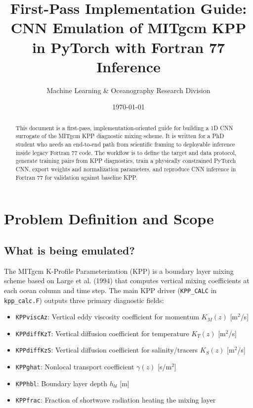 \documentclass[11pt, a4paper]{article}
\title{\textbf{First-Pass Implementation Guide: \\ CNN Emulation of MITgcm KPP in PyTorch with Fortran 77 Inference}}
\author{Machine Learning \& Oceanography Research Division}
\date{\today}
\begin{document}
\maketitle

\begin{abstract}
This document is a first-pass, implementation-oriented guide for building a 1D CNN surrogate of the MITgcm KPP diagnostic mixing scheme. It is written for a PhD student who needs an end-to-end path from scientific framing to deployable inference inside legacy Fortran 77 code. The workflow is to define the target and data protocol, generate training pairs from KPP diagnostics, train a physically constrained PyTorch CNN, export weights and normalization parameters, and reproduce CNN inference in Fortran 77 for validation against baseline KPP.
\end{abstract}

\tableofcontents
\newpage

\section{Problem Definition and Scope}

\subsection{What is being emulated?}

The MITgcm K-Profile Parameterization (KPP) is a boundary layer mixing scheme based on Large et al. (1994) that computes vertical mixing coefficients at each ocean column and time step. The main KPP driver (\texttt{KPP\_CALC} in \texttt{kpp\_calc.F}) outputs three primary diagnostic fields:

\begin{itemize}
    \item \texttt{KPPviscAz}: Vertical eddy viscosity coefficient for momentum $K_M(z)$ [m$^2$/s]
    \item \texttt{KPPdiffKzT}: Vertical diffusion coefficient for temperature $K_T(z)$ [m$^2$/s]
    \item \texttt{KPPdiffKzS}: Vertical diffusion coefficient for salinity/tracers $K_S(z)$ [m$^2$/s]
    \item \texttt{KPPghat}: Nonlocal transport coefficient $\gamma(z)$ [s/m$^2$]
    \item \texttt{KPPhbl}: Boundary layer depth $h_{bl}$ [m]
    \item \texttt{KPPfrac}: Fraction of shortwave radiation heating the mixing layer
\end{itemize}
\end{document}
